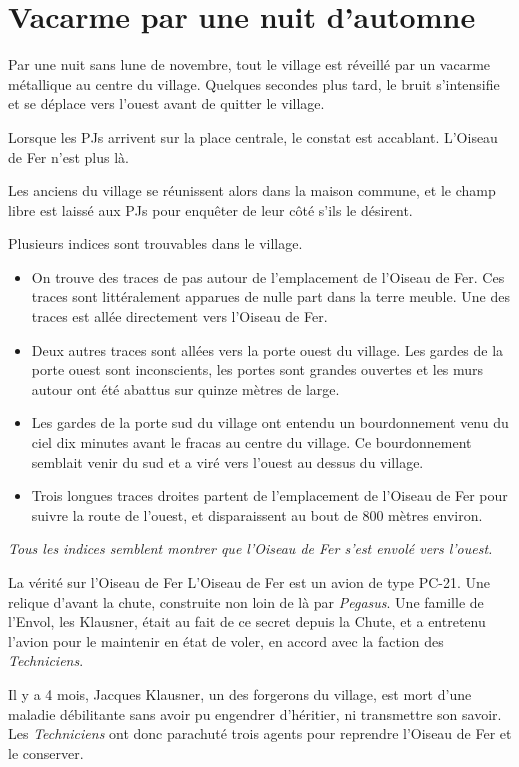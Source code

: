 \documentclass[10pt,twoside,twocolumn,openany,bg=print,justified]{dndbook}
\begin{document}
\section{Vacarme par une nuit d'automne}

Par une nuit sans lune de novembre, tout le village est réveillé par un vacarme métallique au centre du village. Quelques secondes plus tard, le bruit s'intensifie et se déplace vers l'ouest avant de quitter le village.

Lorsque les PJs arrivent sur la place centrale, le constat est accablant. L'Oiseau de Fer n'est plus là.

Les anciens du village se réunissent alors dans la maison commune, et le champ libre est laissé aux PJs pour enquêter de leur côté s'ils le désirent.

Plusieurs indices sont trouvables dans le village.

\begin{itemize}
\item On trouve des traces de pas autour de l'emplacement de l'Oiseau de Fer. Ces traces sont littéralement apparues de nulle part dans la terre meuble. Une des traces est allée directement vers l'Oiseau de Fer.
\item Deux autres traces sont allées vers la porte ouest du village. Les gardes de la porte ouest sont inconscients, les portes sont grandes ouvertes et les murs autour ont été abattus sur quinze mètres de large.
\item Les gardes de la porte sud du village ont entendu un bourdonnement venu du ciel dix minutes avant le fracas au centre du village. Ce bourdonnement semblait venir du sud et a viré vers l'ouest au dessus du village.
\item Trois longues traces droites partent de l'emplacement de l'Oiseau de Fer pour suivre la route de l'ouest, et disparaissent au bout de 800 mètres environ.
\end{itemize}

\textit{Tous les indices semblent montrer que l'Oiseau de Fer s'est envolé vers l'ouest.}

\begin{commentbox}{La vérité sur l'Oiseau de Fer}
L'Oiseau de Fer est un avion de type PC-21. Une relique d'avant la chute, construite non loin de là par \textit{Pegasus}. Une famille de l'Envol, les Klausner, était au fait de ce secret depuis la Chute, et a entretenu l'avion pour le maintenir en état de voler, en accord avec la faction des \textit{Techniciens}.

Il y a 4 mois, Jacques Klausner, un des forgerons du village, est mort d'une maladie débilitante sans avoir pu engendrer d'héritier, ni transmettre son savoir. Les \textit{Techniciens} ont donc parachuté trois agents pour reprendre l'Oiseau de Fer et le conserver.
\end{commentbox}
\end{document}
